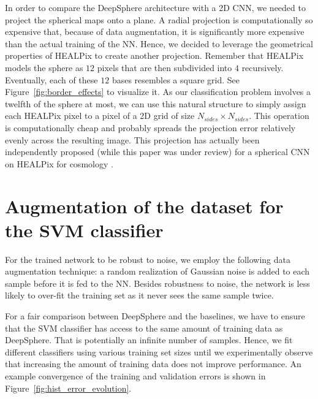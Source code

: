 \documentclass[final,twocolumn,3p,times,sort&compress]{elsarticle}
\newcommand{\figref}[1]{Figure~\ref{fig:#1}}
\newcommand{\1}{\b{1}}              %
\newcommand{\0}{\b{0}}              %
\begin{document}
In order to compare the DeepSphere architecture with a 2D CNN, we needed to project the spherical maps onto a plane.
A radial projection is computationally so expensive that, because of data augmentation, it is significantly more expensive than the actual training of the NN.
Hence, we decided to leverage the geometrical properties of HEALPix to create another projection.
Remember that HEALPix models the sphere as $12$ pixels that are then subdivided into $4$ recursively.
Eventually, each of these $12$ bases resembles a square grid.
See \figref{border_effects} to visualize it.
As our classification problem involves a twelfth of the sphere at most, we can use this natural structure to simply assign each HEALPix pixel to a pixel of a 2D grid of size $N_{sides} \times N_{sides}$.
This operation is computationally cheap and probably spreads the projection error relatively evenly across the resulting image.
This projection has actually been independently proposed (while this paper was under review) for a spherical CNN on HEALPix for cosmology \cite{krachmalnicoff2019convolutional}.

\section{Augmentation of the dataset for the SVM classifier}
\label{sec:dataset_augmentation}


For the trained network to be robust to noise, we employ the following data augmentation technique: a random realization of Gaussian noise is added to each sample before it is fed to the NN.
Besides robustness to noise, the network is less likely to over-fit the training set as it never sees the same sample twice.

For a fair comparison between DeepSphere and the baselines, we have to ensure that the SVM classifier has access to the same amount of training data as DeepSphere. That is potentially an infinite number of samples. Hence, we fit different classifiers using various training set sizes until we experimentally observe that increasing the amount of training data does not improve performance. An example convergence of the training and validation errors is shown in \figref{hist_error_evolution}.
\end{document}

